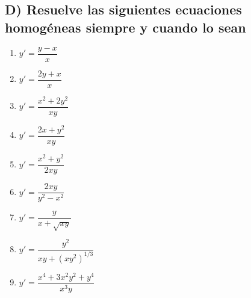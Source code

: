 \documentclass[a4paper,12pt]{article}
\begin{document}
\subsection*{D) Resuelve las siguientes ecuaciones homogéneas siempre y cuando lo sean}
\begin{multicols}{2}
\begin{enumerate}
  \item $y' = \dfrac{y-x}{x}$
  \item $y' = \dfrac{2y+x}{x}$
  \item $y' = \dfrac{x^2+2y^2}{xy}$
  \item $y' = \dfrac{2x+y^2}{xy}$
  \item $y' = \dfrac{x^2+y^2}{2xy}$
  \item $y' = \dfrac{2xy}{y^2-x^2}$
  \item $y' = \dfrac{y}{x+\sqrt{xy}}$
  \item $y' = \dfrac{y^2}{xy+(xy^2)^{1/3}}$
  \item $y' = \dfrac{x^4+3x^2y^2+y^4}{x^3y}$
\end{enumerate}
\end{multicols}
\end{document}
